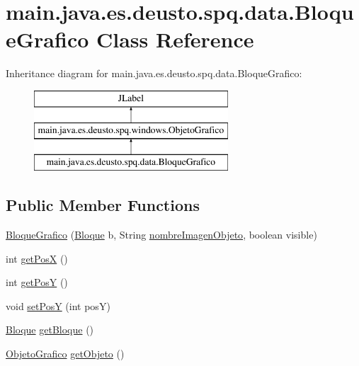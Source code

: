 \hypertarget{classmain_1_1java_1_1es_1_1deusto_1_1spq_1_1data_1_1_bloque_grafico}{}\section{main.\+java.\+es.\+deusto.\+spq.\+data.\+Bloque\+Grafico Class Reference}
\label{classmain_1_1java_1_1es_1_1deusto_1_1spq_1_1data_1_1_bloque_grafico}
Inheritance diagram for main.\+java.\+es.\+deusto.\+spq.\+data.\+Bloque\+Grafico\+:\begin{figure}[H]
\begin{center}
\leavevmode
\includegraphics[height=3.000000cm]{classmain_1_1java_1_1es_1_1deusto_1_1spq_1_1data_1_1_bloque_grafico}
\end{center}
\end{figure}
\subsection*{Public Member Functions}
\begin{DoxyCompactItemize}
\item 
\hyperlink{classmain_1_1java_1_1es_1_1deusto_1_1spq_1_1data_1_1_bloque_grafico_a69517caff67216c3ad78e0208bf45b51}{Bloque\+Grafico} (\hyperlink{classmain_1_1java_1_1es_1_1deusto_1_1spq_1_1data_1_1_bloque}{Bloque} b, String \hyperlink{classmain_1_1java_1_1es_1_1deusto_1_1spq_1_1windows_1_1_objeto_grafico_aaf5e1e8c4ebff8a39c72b07c8af6ca86}{nombre\+Imagen\+Objeto}, boolean visible)
\item 
int \hyperlink{classmain_1_1java_1_1es_1_1deusto_1_1spq_1_1data_1_1_bloque_grafico_a3b3246f25d904795805a35077736b401}{get\+PosX} ()
\item 
int \hyperlink{classmain_1_1java_1_1es_1_1deusto_1_1spq_1_1data_1_1_bloque_grafico_a8e7a3b1859ea6b3f2040323438c82ef6}{get\+PosY} ()
\item 
void \hyperlink{classmain_1_1java_1_1es_1_1deusto_1_1spq_1_1data_1_1_bloque_grafico_aaf8e5ff1114f980102c03f3215a508c1}{set\+PosY} (int posY)
\item 
\hyperlink{classmain_1_1java_1_1es_1_1deusto_1_1spq_1_1data_1_1_bloque}{Bloque} \hyperlink{classmain_1_1java_1_1es_1_1deusto_1_1spq_1_1data_1_1_bloque_grafico_a11b4f4a371cbe47cd5ddbb2718925a92}{get\+Bloque} ()
\item 
\hyperlink{classmain_1_1java_1_1es_1_1deusto_1_1spq_1_1windows_1_1_objeto_grafico}{Objeto\+Grafico} \hyperlink{classmain_1_1java_1_1es_1_1deusto_1_1spq_1_1data_1_1_bloque_grafico_a93c7c8717111e871aa234fd047c76ca5}{get\+Objeto} ()
\end{DoxyCompactItemize}
